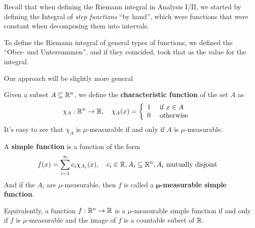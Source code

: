 
Recall that when defining the Riemann integral in Analysis I/II, we started by defining the Integral of \emph{step functions} ``by hand'', which were functions that were constant when decomposing them into intervals.

To define the Riemann integral of general types of functions, we defined the ``Ober- und Untersummen'', and if they coincided, took that as the value for the integral.

Our approach will be slightly more general

\begin{dfn}[]
Given a subset $A \subseteq \mathbb{R}^{n}$, we define the \textbf{characteristic function} of the set $A$ as
\begin{align*}
  \chi_A: \mathbb{R}^{n} \to \mathbb{R}, \quad \chi_A(x) = \left\{\begin{array}{ll}
      1 & \text{ if } x \in A\\
     0 &  \text{ otherwise}
  \end{array} \right.
\end{align*}
It's easy to see that $\chi_A$ is $\mu$-measurable if and only if $A$ is $\mu$-measurable.


A \textbf{simple function} is a function of the form
\begin{align*}
  f(x) = \sum_{i=1}^{\infty} c_i \chi_{A_i}(x), \quad c_i \in \mathbb{R}, A_i \subseteq \mathbb{R}^{n}, A_i \text{ mutually disjoint}
\end{align*}
And if the $A_i$ are $\mu$-measurable, then $f$ is called a \textbf{$\bm{\mu}$-measurable simple function}.

Equivalently, a function $f: \mathbb{R}^{n} \to  \mathbb{R}$ is a $\mu$-measurable simple function if and only if $f$ is $\mu$-measurable and the image of $f$ is a countable subset of $\mathbb{R}$.

\end{dfn}


